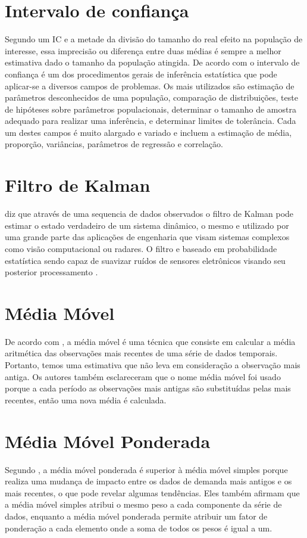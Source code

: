 \section{Intervalo de confiança}
Segundo \cite{patino2015intervalos} um IC e a metade da divisão do tamanho do real efeito na população de interesse, essa imprecisão ou diferença entre duas médias é sempre a melhor estimativa dado o tamanho da população atingida. De acordo com \cite{henriques2011dificuldades} o intervalo de confiança é um dos procedimentos gerais de inferência estatística que pode aplicar-se a diversos campos de problemas. Os mais utilizados são estimação de parâmetros desconhecidos de uma população, comparação de distribuições, teste de hipóteses sobre parâmetros populacionais, determinar o tamanho de amostra adequado para realizar uma inferência, e determinar limites de tolerância. Cada um destes campos é muito alargado e variado e incluem a estimação de média, proporção, variâncias, parâmetros de regressão e correlação.  


\section{ Filtro de Kalman}
\cite{tan2005sensoclean} diz que através de uma sequencia de dados observados o filtro de Kalman pode estimar o estado verdadeiro de um sistema dinâmico, o mesmo e utilizado por uma grande parte das aplicações de engenharia que visam sistemas complexos como visão computacional ou radares. O filtro e baseado em probabilidade estatística sendo capaz de suavizar ruídos de sensores eletrônicos visando seu posterior processamento \cite{International_Conference__Zhuang}.

\section{Média Móvel}
De acordo com \cite{santos2021educaccao}, a média móvel é uma técnica que consiste em calcular a média aritmética das observações mais recentes de uma série de dados temporais. Portanto, temos uma estimativa que não leva em consideração a observação mais antiga. Os autores também esclareceram que o nome média móvel foi usado porque a cada período as observações mais antigas são substituídas pelas mais recentes, então uma nova média é calculada.


\section{Média Móvel Ponderada}
Segundo \cite{ribeiro2020analise}, a média móvel ponderada é superior à média móvel simples porque realiza uma mudança de impacto entre os dados de demanda mais antigos e os mais recentes, o que pode revelar algumas tendências. Eles também afirmam que a média móvel simples atribui o mesmo peso a cada componente da série de dados, enquanto a média móvel ponderada permite atribuir um fator de ponderação a cada elemento onde a soma de todos os pesos é igual a um.




